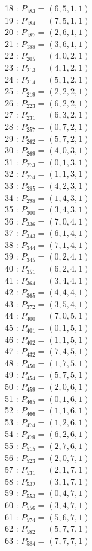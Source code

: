 \documentclass{article}
\begin{document}
{\begin{multicols}{2}
18 : $P_{183}=( 6, 5, 1, 1 )$\\
19 : $P_{184}=( 7, 5, 1, 1 )$\\
20 : $P_{187}=( 2, 6, 1, 1 )$\\
21 : $P_{188}=( 3, 6, 1, 1 )$\\
22 : $P_{205}=( 4, 0, 2, 1 )$\\
23 : $P_{213}=( 4, 1, 2, 1 )$\\
24 : $P_{214}=( 5, 1, 2, 1 )$\\
25 : $P_{219}=( 2, 2, 2, 1 )$\\
26 : $P_{223}=( 6, 2, 2, 1 )$\\
27 : $P_{231}=( 6, 3, 2, 1 )$\\
28 : $P_{257}=( 0, 7, 2, 1 )$\\
29 : $P_{262}=( 5, 7, 2, 1 )$\\
30 : $P_{269}=( 4, 0, 3, 1 )$\\
31 : $P_{273}=( 0, 1, 3, 1 )$\\
32 : $P_{274}=( 1, 1, 3, 1 )$\\
33 : $P_{285}=( 4, 2, 3, 1 )$\\
34 : $P_{298}=( 1, 4, 3, 1 )$\\
35 : $P_{300}=( 3, 4, 3, 1 )$\\
36 : $P_{336}=( 7, 0, 4, 1 )$\\
37 : $P_{343}=( 6, 1, 4, 1 )$\\
38 : $P_{344}=( 7, 1, 4, 1 )$\\
39 : $P_{345}=( 0, 2, 4, 1 )$\\
40 : $P_{351}=( 6, 2, 4, 1 )$\\
41 : $P_{364}=( 3, 4, 4, 1 )$\\
42 : $P_{365}=( 4, 4, 4, 1 )$\\
43 : $P_{372}=( 3, 5, 4, 1 )$\\
44 : $P_{400}=( 7, 0, 5, 1 )$\\
45 : $P_{401}=( 0, 1, 5, 1 )$\\
46 : $P_{402}=( 1, 1, 5, 1 )$\\
47 : $P_{432}=( 7, 4, 5, 1 )$\\
48 : $P_{450}=( 1, 7, 5, 1 )$\\
49 : $P_{454}=( 5, 7, 5, 1 )$\\
50 : $P_{459}=( 2, 0, 6, 1 )$\\
51 : $P_{465}=( 0, 1, 6, 1 )$\\
52 : $P_{466}=( 1, 1, 6, 1 )$\\
53 : $P_{474}=( 1, 2, 6, 1 )$\\
54 : $P_{479}=( 6, 2, 6, 1 )$\\
55 : $P_{515}=( 2, 7, 6, 1 )$\\
56 : $P_{523}=( 2, 0, 7, 1 )$\\
57 : $P_{531}=( 2, 1, 7, 1 )$\\
58 : $P_{532}=( 3, 1, 7, 1 )$\\
59 : $P_{553}=( 0, 4, 7, 1 )$\\
60 : $P_{556}=( 3, 4, 7, 1 )$\\
61 : $P_{574}=( 5, 6, 7, 1 )$\\
62 : $P_{582}=( 5, 7, 7, 1 )$\\
63 : $P_{584}=( 7, 7, 7, 1 )$\\
\end{multicols}
}
\end{document}
